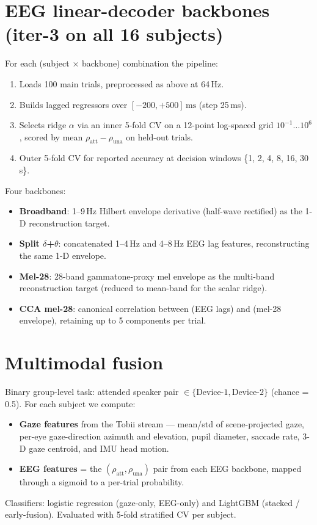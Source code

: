 \section{EEG linear-decoder backbones (iter-3 on all 16 subjects)}

For each (subject $\times$ backbone) combination the pipeline:
\begin{enumerate}
  \item Loads 100 main trials, preprocessed as above at 64\,Hz.
  \item Builds lagged regressors over $[-200, +500]\,\text{ms}$ (step 25\,ms).
  \item Selects ridge $\alpha$ via an inner 5-fold CV on a 12-point
        log-spaced grid $10^{-1}\ldots10^6$, scored by mean
        $\rho_\text{att}-\rho_\text{una}$ on held-out trials.
  \item Outer 5-fold CV for reported accuracy at decision windows
        \{1, 2, 4, 8, 16, 30\,s\}.
\end{enumerate}

Four backbones:
\begin{itemize}
  \item \textbf{Broadband}: 1--9\,Hz Hilbert envelope derivative (half-wave
        rectified) as the 1-D reconstruction target.
  \item \textbf{Split $\delta$+$\theta$}: concatenated 1--4\,Hz and 4--8\,Hz
        EEG lag features, reconstructing the same 1-D envelope.
  \item \textbf{Mel-28}: 28-band gammatone-proxy mel envelope as the
        multi-band reconstruction target (reduced to mean-band for the
        scalar ridge).
  \item \textbf{CCA mel-28}: canonical correlation between (EEG lags) and
        (mel-28 envelope), retaining up to 5 components per trial.
\end{itemize}

\section{Multimodal fusion}

Binary group-level task: attended speaker pair $\in \{\text{Device-1},
\text{Device-2}\}$ (chance = 0.5). For each subject we compute:
\begin{itemize}
  \item \textbf{Gaze features} from the Tobii  stream ---
        mean/std of scene-projected gaze, per-eye gaze-direction azimuth
        and elevation, pupil diameter, saccade rate, 3-D gaze centroid,
        and IMU head motion.
  \item \textbf{EEG features} = the $(\rho_\text{att}, \rho_\text{una})$
        pair from each EEG backbone, mapped through a sigmoid to a
        per-trial probability.
\end{itemize}
Classifiers: logistic regression (gaze-only, EEG-only) and LightGBM
(stacked / early-fusion). Evaluated with 5-fold stratified CV per subject.

